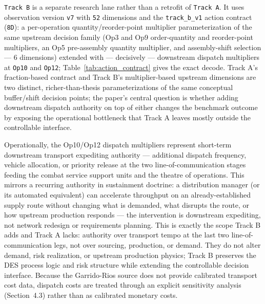 \texttt{Track\ B} is a separate research lane rather than a retrofit of
\texttt{Track\ A}. It uses observation version \texttt{v7} with
\texttt{52} dimensions and the \texttt{track\_b\_v1} action contract
(\texttt{8D}): a per-operation quantity/reorder-point multiplier
parameterization of the same upstream decision family (Op3 and Op9
order-quantity and reorder-point multipliers, an Op5 pre-assembly
quantity multiplier, and assembly-shift selection --- 6 dimensions)
extended with --- decisively --- downstream dispatch multipliers at
\texttt{Op10} and \texttt{Op12};
Table~\ref{tab:action_contract} gives the exact decode. Track A's
fraction-based contract and Track B's multiplier-based upstream
dimensions are two distinct, richer-than-thesis parameterizations of the
same conceptual buffer/shift decision points; the paper's central
question is whether adding downstream dispatch authority on top of
either changes the benchmark outcome by exposing the operational
bottleneck that Track A leaves mostly outside the controllable
interface.

Operationally, the Op10/Op12 dispatch multipliers represent short-term
downstream transport expediting authority --- additional dispatch
frequency, vehicle allocation, or priority release at the two
line-of-communication stages feeding the combat service support units and
the theatre of operations. This mirrors a recurring authority in
sustainment doctrine: a distribution manager (or its automated
equivalent) can accelerate throughput on an already-established supply
route without changing what is demanded, what disrupts the route, or how
upstream production responds --- the intervention is downstream expediting,
not network redesign or requirements planning. This is exactly the scope
Track B adds and Track A lacks: authority over transport tempo at the
last two line-of-communication legs, not over sourcing, production, or
demand. They do not alter demand, risk realization, or
upstream production physics; Track B preserves the DES process logic and
risk structure while extending the controllable decision interface.
Because the Garrido-Rios source does not provide calibrated transport
cost data, dispatch costs are treated through an explicit sensitivity
analysis (Section~4.3) rather than as calibrated monetary costs.

